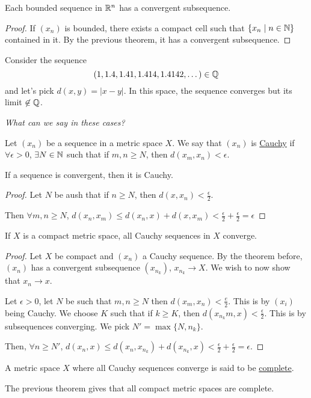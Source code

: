 \begin{corollary}
    Each bounded sequence in $\mathbb R^n$ has a convergent subsequence.
\end{corollary}
\begin{proof}
    If $(x_n)$ is bounded, there exists a compact cell such that $\{x_n \mid n\in \mathbb N\}$ contained in it. By the previous theorem, it has a convergent subsequence.
\end{proof}
\begin{example}
    Consider the sequence
    \[(1, 1.4, 1.41, 1.414, 1.4142, \dots)\in \mathbb Q\]
    and let's pick $d(x, y) = |x - y|$. In this space, the sequence converges but its limit $\not\in \mathbb Q$.

    \emph{What can we say in these cases?}
\end{example}
\begin{definition}
    Let $(x_n)$ be a sequence in a metric space $X$. We say that $(x_n)$ is \ul{Cauchy} if $\forall \epsilon > 0$, $\exists N\in \mathbb N$ such that if $m, n\geq N$, then $d(x_m, x_n) < \epsilon$.
\end{definition}
\begin{remark}
    If a sequence is convergent, then it is Cauchy.
\end{remark}
\begin{proof}
    Let $N$ be aush that if $n\geq N$, then $d(x, x_n) < \frac{\epsilon}{2}$.

    Then $\forall m, n\geq N$, $d(x_n, x_m)\leq d(x_n, x) + d(x, x_m) < \frac{\epsilon}{2} + \frac{\epsilon}{2} = \epsilon$
\end{proof}

\begin{theorem}
    If $X$ is a compact metric space, all Cauchy sequences in $X$ converge.
\end{theorem}
\begin{proof}
    Let $X$ be compact and $(x_n)$ a Cauchy sequence. By the theorem before, $(x_n)$ has a convergent subsequence $(x_{n_k})$, $x_{n_k}\to X$. We wish to now show that $x_n\to x$.

    Let $\epsilon > 0$, let $N$ be such that $m, n\geq N$ then $d(x_m, x_n) < \frac{e}{2}$. This is by $(x_i)$ being Cauchy. We choose $K$ such that if $k \geq K$, then $d(x_{n_k}m, x)< \frac{\epsilon}{2}$. This is by subsequences converging. We pick $N' = \max\{N, n_k\}$.

    Then, $\forall n\geq N'$, $d(x_n, x)\leq d(x_n, x_{n_k})+ d(x_{n_k}, x) < \frac{\epsilon}{2} + \frac{\epsilon}{2} = \epsilon$.
\end{proof}
\begin{definition}
    A metric space $X$ where all Cauchy sequences converge is said to be \ul{complete}.

    The previous theorem gives that all compact metric spaces are complete.
\end{definition}

